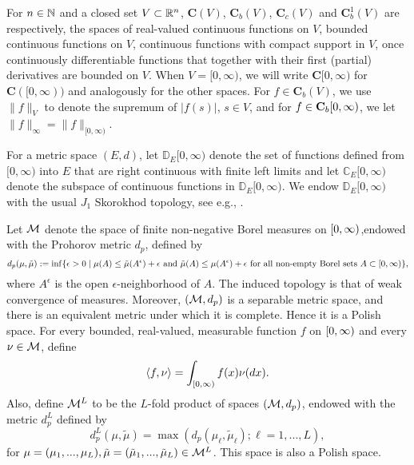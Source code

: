 \documentclass[stsy]{informs-stsy}
\begin{document}
For  $n\in\mathbb{N}$ and  a closed set $V\subset\mathbb{R}^n$, $\mathbf{C}(V)$, $\mathbf{C}_b(V)$, $\mathbf{C}_c(V)$ and $\mathbf{C}^1_b(V)$  are respectively, the spaces of real-valued continuous functions on $V$, bounded continuous functions on $V$,  continuous functions with compact support in $V$, once continuously differentiable functions that together with their first (partial) derivatives are
bounded on $V$. When $V = [0,\infty)$, we will write $\mathbf{C}[0,\infty)$ for $\mathbf{C}([0,\infty))$ and analogously for the other spaces. For $f\in \mathbf{C}_b(V)$, we use $\|f\|_V$ to denote the supremum of $|f(s)|$, $s \in V$, and for $f\in\mathbf{C}_b[0,\infty)$, we let $\|f\|_\infty=\|f\|_{[0,\infty)} $. 

For a metric space $(E, d)$, let $\mathbb D_E[0,\infty)$ denote the set of functions defined from $[0,\infty)$ into $E$ that are right continuous with finite left limits
and let $\mathbb C_E[0,\infty)$ denote the subspace of continuous functions in $\mathbb D_E [0, \infty)$. We endow $\mathbb D_E [0,\infty)$ with the usual $J_1$ Skorokhod topology,
see e.g., \cite{KurtzBook}.


Let $\mathcal{M}$ denote the space of finite non-negative Borel measures on $[0,\infty)$,endowed with  the Prohorov metric $d_p$, defined by
\[
d_p(\mu,\tilde\mu) := \inf\{ \epsilon>0 \; | \; \mu(A)\leq \tilde\mu(A^\epsilon)+\epsilon\text{ and }\tilde\mu(A)\leq \mu(A^\epsilon)+\epsilon\text{ for all non-empty Borel sets } A\subset[0,\infty)\},
\]
where $A^\epsilon$ is the open $\epsilon$-neighborhood of $A$. 
The induced topology is that of weak convergence of measures. Moreover, $(\mathcal{M}, d_p)$ is a separable metric space, and there is an equivalent metric
under which it is complete. Hence it is a Polish space.
For every bounded, real-valued, measurable function $f$ on $[0,\infty)$ and every $\nu\in\mathcal{M}$, define
\[
\langle f ,\nu \rangle = \int_{[0,\infty)}f(x)\nu(dx).
\]
Also, define $\mathcal{M}^L$ to be the $L$-fold product of spaces $(\mathcal{M},d_p)$, endowed with the metric $d_p^L$ defined by 
\[
d_p^L(\mu,\tilde\mu)=\max(d_p(\mu_\ell,\tilde\mu_\ell);\ell=1,...,L),
\]
for $\mu=(\mu_1,...,\mu_L),\tilde\mu=(\tilde\mu_1,...,\tilde\mu_L)\in\mathcal{M}^L$. This space is also a Polish space.
\end{document}

